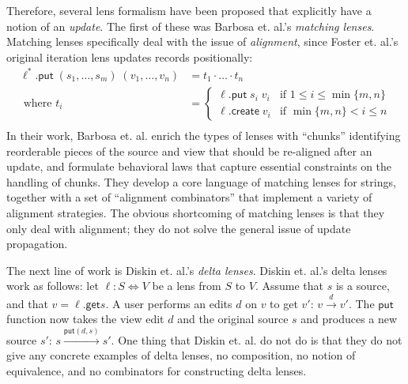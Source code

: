\documentclass[acmsmall,review,anonymous]{acmart}\settopmatter{printfolios=true,printccs=false,printacmref=false}
\theoremstyle{definition}
\newcommand{\kw}[1]{\ensuremath{\mathsf{#1}}\xspace}
\newcommand{\get}{\ensuremath{\kw{get}}\xspace}
\newcommand{\pput}{\ensuremath{\kw{put}}\xspace}
\newcommand{\create}{\ensuremath{\kw{create}}\xspace}
\begin{document}
Therefore, several lens formalism have been proposed that explicitly have a
notion of an {\em update}. The first of these was Barbosa et. al.'s {\em
matching lenses}\cite{barbosa2010matching}. Matching lenses specifically deal
with the issue of {\em alignment}, since Foster et. al.'s original iteration
lens updates records positionally:
\begin{align*}
\ell^* .\pput \; (s_1, \ldots, s_m) \; (v_1, \ldots, v_n) &= t_1 \cdot
\ldots \cdot t_n\\
\text{ where } t_i &= \begin{cases}
\ell.\pput \; s_i \; v_i & \text{if } 1 \leq i \leq \min\{m, n\}\\
\ell.\create \; v_i & \text{if } \min\{m, n\} < i \leq n
\end{cases}\\
\end{align*}
In their work, Barbosa et. al. enrich the types of lenses with ``chunks''
identifying reorderable pieces of the source and view that should be re-aligned
after an update, and formulate behavioral laws that capture essential
constraints on the handling of chunks. They develop a core language
of matching lenses for strings, together with a set of ``alignment
combinators'' that implement a variety of alignment strategies. The obvious
shortcoming of matching lenses is that they only deal with alignment; they do
not solve the general issue of update propagation.

The next line of work is Diskin et. al.'s {\em delta
lenses}\cite{diskin2011asymmetric,diskin2011state}. Diskin et. al.'s delta
lenses work as follows: let $\ell : S \Leftrightarrow V$ be a lens from
$S$ to $V$. Assume that $s$ is a source, and that $v = \ell.\get s$. A user
performs an edits $d$ on $v$ to get $v'$: $v \xrightarrow{d} v'$. The \pput
function now takes the view edit $d$ and the original source $s$ and produces a
new source $s'$: $s \xrightarrow{\pput(d, s)} s'$. One thing that Diskin et. al.
do not do is that they do not give any concrete examples of delta lenses,
no composition, no notion of equivalence, and no combinators for constructing
delta lenses.
\end{document}
